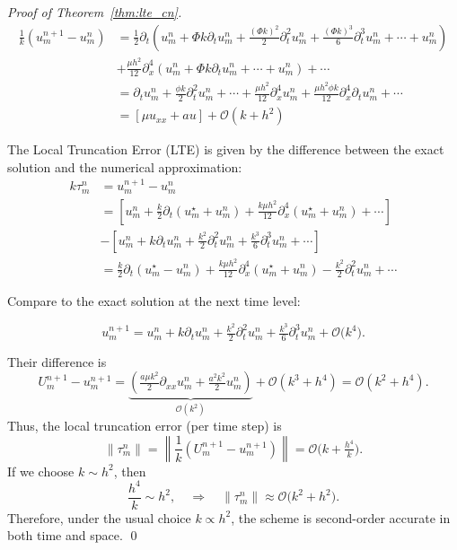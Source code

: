 \begin{proof}[Proof of Theorem~\ref{thm:lte_cn}]
\begin{align*}
    \frac{1}{k}\left(u_m^{n+1} - u_m^n\right) & = \tfrac{1}{2}\partial_t\left(u_m^n + \Phi k \partial_t u_m^n + \frac{(\Phi k)^2}{2} \partial_t^2 u_m^n + \frac{(\Phi k)^3}{6} \partial_t^3 u_m^n + \cdots + u_m^n\right) \\
    &+ \tfrac{\mu h^2}{12}\partial_x^4 \left(u_m^n + \Phi k \partial_t u_m^n + \cdots + u_m^n\right) + \cdots\\
    &= \partial_t u_m^n + \tfrac{\phi k}{2}\partial_t^2 u_m^n + \cdots + \tfrac{\mu h^2}{12}\partial_x^4 u_m^n + \tfrac{\mu h^2\phi k}{12}\partial_x^4\partial_t u_m^n + \cdots\\
    &= \left[\mu u_{xx} + au\right] + \mathcal{O}(k + h^2) 
  \end{align*}

  The Local Truncation Error (LTE) is given by the difference between the exact solution and the numerical approximation:
  \begin{align*}
    k\tau_m^n & = u_m^{n+1} - u_m^n                                                                                                                                                   \\
              & = \left[u_m^n + \tfrac{k}{2}\partial_t\left(u_m^\star + u_m^n\right) + \tfrac{k \mu h^2}{12}\partial_x^4 \left(u_m^\star + u_m^n\right) + \cdots\right]               \\
              & - \left[u_m^n + k\partial_t u_m^n + \tfrac{k^2}{2}\partial_t^2 u_m^n + \tfrac{k^3}{6}\partial_t^3 u_m^n + \cdots\right]                                               \\
              & = \tfrac{k}{2}\partial_t\left(u_m^\star - u_m^n\right) + \tfrac{k \mu h^2}{12}\partial_x^4 \left(u_m^\star + u_m^n\right) - \tfrac{k^2}{2}\partial_t^2 u_m^n + \cdots
  \end{align*}


  Compare to the exact solution at the next time level:

  \[
    u_m^{n+1}
    = u_m^n
    + k\partial_t u_m^n
    + \tfrac{k^2}{2}\partial_t^2 u_m^n
    + \tfrac{k^3}{6}\partial_t^3 u_m^n
    + \mathcal{O}\bigl(k^4\bigr).
  \]

  Their difference is
  \[
    U_m^{n+1} - u_m^{n+1} =
    \underbrace{\left(\tfrac{a\mu k^2}{2}\partial_{xx}u_m^n
      + \tfrac{a^2k^2}{2}u_m^n\right)}_{\mathcal{O}(k^2)}
    + \mathcal{O}\left(k^3 + h^4\right)
    = \mathcal{O}\left(k^2 + h^4\right).
  \]
  Thus, the local truncation error (per time step) is
  \[
    \lVert{\tau_m^n}\rVert
    = \left\lVert\dfrac{1}{k}\left(U_m^{n+1} - u_m^{n+1}\right) \right\rVert
    = \mathcal{O}\bigl(k + \tfrac{h^4}{k}\bigr).
  \]
  If we choose $k \sim h^2$, then
  \[
    \frac{h^4}{k} \sim h^2,
    \quad
    \Rightarrow
    \quad
    \lVert{\tau_m^n}\rVert \approx \mathcal{O}\bigl(k^2 + h^2\bigr).
  \]
  Therefore, under the usual choice $k \propto h^2$, the scheme is second-order accurate in both time and space. \qed
\end{proof}

